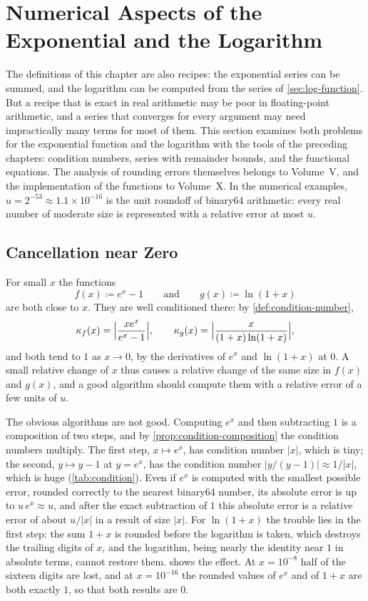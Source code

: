 \section{Numerical Aspects of the Exponential and the Logarithm}
\label{sec:exp-log-numerics}

The definitions of this chapter are also recipes: the exponential series can be summed, and the logarithm can be computed from the series of \cref{sec:log-function}. But a recipe that is exact in real arithmetic may be poor in floating-point arithmetic, and a series that converges for every argument may need impractically many terms for most of them. This section examines both problems for the exponential function and the logarithm with the tools of the preceding chapters: condition numbers, series with remainder bounds, and the functional equations. The analysis of rounding errors themselves belongs to Volume~V, and the implementation of the functions to Volume~X. In the numerical examples, $u=2^{-53}\approx1.1\times10^{-16}$ is the unit roundoff of binary64 arithmetic: every real number of moderate size is represented with a relative error at most $u$.

\subsection{Cancellation near Zero}

For small $x$ the functions
\[
f(x)\coloneqq e^x-1\qquad\text{and}\qquad g(x)\coloneqq\ln(1+x)
\]
are both close to $x$. They are well conditioned there: by \cref{def:condition-number},
\[
\kappa_f(x)=\Bigl|\frac{xe^x}{e^x-1}\Bigr|,\qquad\kappa_g(x)=\Bigl|\frac x{(1+x)\ln(1+x)}\Bigr|,
\]
and both tend to $1$ as $x\to0$, by the derivatives of $e^x$ and $\ln(1+x)$ at $0$. A small relative change of $x$ thus causes a relative change of the same size in $f(x)$ and $g(x)$, and a good algorithm should compute them with a relative error of a few units of $u$.

The obvious algorithms are not good. Computing $e^x$ and then subtracting $1$ is a composition of two steps, and by \cref{prop:condition-composition} the condition numbers multiply. The first step, $x\mapsto e^x$, has condition number $|x|$, which is tiny; the second, $y\mapsto y-1$ at $y=e^x$, has the condition number $|y/(y-1)|\approx1/|x|$, which is huge (\cref{tab:condition}). Even if $e^x$ is computed with the smallest possible error, rounded correctly to the nearest binary64 number, its absolute error is up to $u\,e^x\approx u$, and after the exact subtraction of $1$ this absolute error is a relative error of about $u/|x|$ in a result of size $|x|$. For $\ln(1+x)$ the trouble lies in the first step: the sum $1+x$ is rounded before the logarithm is taken, which destroys the trailing digits of $x$, and the logarithm, being nearly the identity near $1$ in absolute terms, cannot restore them.  shows the effect. At $x=10^{-8}$ half of the sixteen digits are lost, and at $x=10^{-16}$ the rounded values of $e^x$ and of $1+x$ are both exactly $1$, so that both results are $0$.

